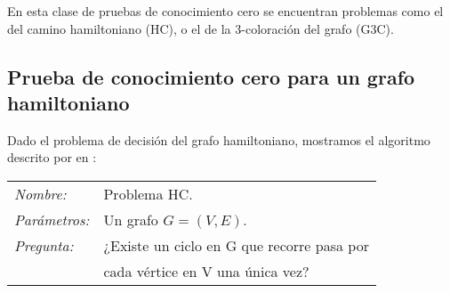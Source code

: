 En esta clase de pruebas de conocimiento cero se encuentran problemas como el del camino hamiltoniano (HC), o el de la 3-coloración del grafo (G3C).


\subsection{Prueba de conocimiento cero para un grafo hamiltoniano}

Dado el problema de decisión del grafo hamiltoniano, mostramos el algoritmo descrito por \citeauthor{blum} en \citep{blum}:


\hfil

\begin{tabular}{|ll}
	\textit{Nombre:} & Problema HC. \\
	\textit{Parámetros:} &Un grafo $G=(V,E)$. \\
	\textit{Pregunta:} & ¿Existe un ciclo en G que recorre pasa por\\& cada vértice en V una única vez? \\
\end{tabular}
\\

\hfil

